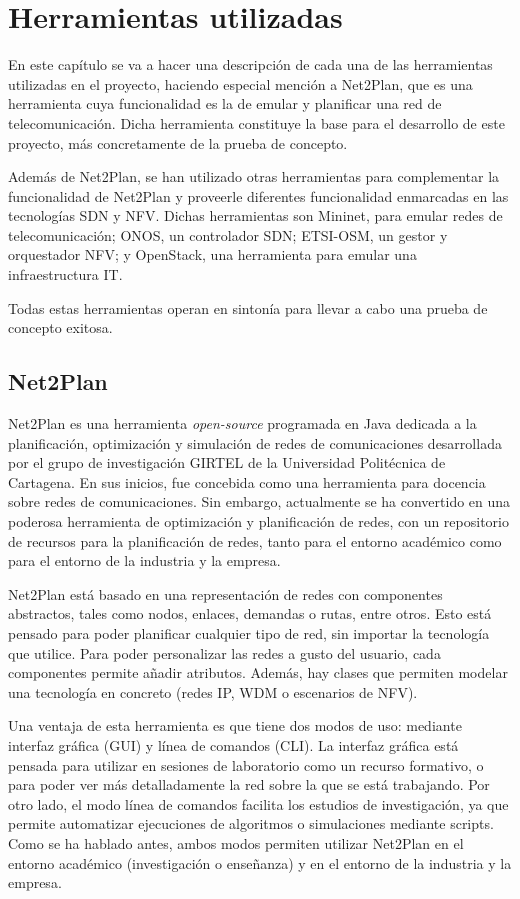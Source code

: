\chapter{Herramientas utilizadas}

En este capítulo se va a hacer una descripción de cada una de las herramientas utilizadas en el proyecto, haciendo especial mención a Net2Plan, que es una herramienta cuya funcionalidad es la de emular y planificar una red de telecomunicación. Dicha herramienta constituye la base para el desarrollo de este proyecto, más concretamente de la prueba de concepto.

Además de Net2Plan, se han utilizado otras herramientas para complementar la funcionalidad de Net2Plan y proveerle diferentes funcionalidad enmarcadas en las tecnologías SDN y NFV. Dichas herramientas son Mininet, para emular redes de telecomunicación; ONOS, un controlador SDN; ETSI-OSM, un gestor y orquestador NFV; y OpenStack, una herramienta para emular una infraestructura IT.

Todas estas herramientas operan en sintonía para llevar a cabo una prueba de concepto exitosa.


\section{Net2Plan}
\label{sec:net2plan}

Net2Plan\cite{net2planbib} es una herramienta \textit{open-source} programada en Java dedicada a la planificación, optimización y simulación de redes de comunicaciones desarrollada por el grupo de investigación GIRTEL de la Universidad Politécnica de Cartagena. En sus inicios, fue concebida como una herramienta para docencia sobre redes de comunicaciones. Sin embargo, actualmente se ha convertido en una poderosa herramienta de optimización y planificación de redes, con un repositorio de recursos para la planificación de redes, tanto para el entorno académico como para el entorno de la industria y la empresa.

Net2Plan está basado en una representación de redes con componentes abstractos, tales como nodos, enlaces, demandas o rutas, entre otros. Esto está pensado para poder planificar cualquier tipo de red, sin importar la tecnología que utilice. Para poder personalizar las redes a gusto del usuario, cada componentes permite añadir atributos. Además, hay clases que permiten modelar una tecnología en concreto (redes IP, WDM o escenarios de NFV).

Una ventaja de esta herramienta es que tiene dos modos de uso: mediante interfaz gráfica (GUI) y línea de comandos (CLI). La interfaz gráfica está pensada para utilizar en sesiones de laboratorio como un recurso formativo, o para poder ver más detalladamente la red sobre la que se está trabajando. Por otro lado, el modo línea de comandos facilita los estudios de investigación, ya que permite automatizar ejecuciones de algoritmos o simulaciones mediante scripts. Como se ha hablado antes, ambos modos permiten utilizar Net2Plan en el entorno académico (investigación o enseñanza) y en el entorno de la industria y la empresa.

